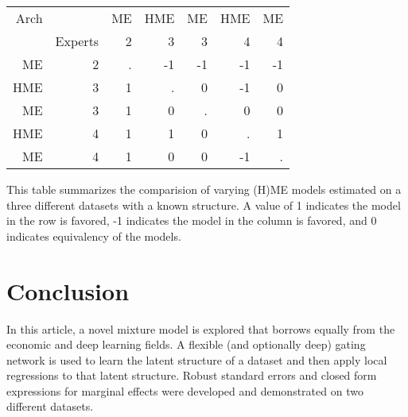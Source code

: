 \documentclass[12pt]{article}
\theoremstyle{definition}
\begin{document}
\begin{table}[t!]
\begin{threeparttable}
\begin{tabular}[l]{r r r r r r r}
      Arch    &         & ME    & HME   & ME    & HME   & ME       \\
              & Experts & 2     & 3     & 3     & 4     & 4        \\
      \hline
      ME      & 2       & .     & -1    & -1    & -1    & -1       \\
      HME     & 3       & 1     & .     & 0     & -1    & 0        \\
      ME      & 3       & 1     & 0     & .     & 0     & 0        \\
      HME     & 4       & 1     & 1     & 0     & .     & 1        \\
      ME      & 4       & 1     & 0     & 0     & -1    & .        \\
      \hline
    \end{tabular}
    \begin{tablenotes}
      \item{\footnotesize This table summarizes the comparision of varying (H)ME models estimated on a three different datasets with a known structure. A value of 1 indicates the model in the row is favored, -1 indicates the model in the column is favored, and 0 indicates equivalency of the models.}
    \end{tablenotes} \label{tbl:monte_carlo_voung_results}
  \end{threeparttable}
\end{table}


\clearpage

\section{Conclusion} \label{sec:Conclusion}

In this article, a novel mixture model is explored that borrows equally from the economic and deep learning fields. A flexible (and optionally deep) gating network is used to learn the latent structure of a dataset and then apply local regressions to that latent structure. Robust standard errors and closed form expressions for marginal effects were developed and demonstrated on two different datasets. 



\clearpage

\printbibliography
\end{document}
